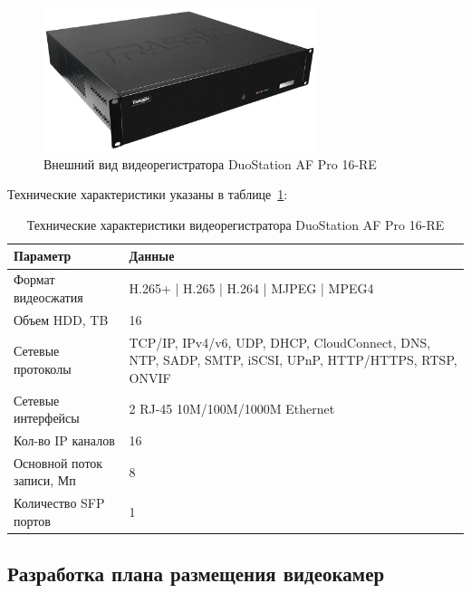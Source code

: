 \begin{figure}[h]
    \begin{center}
        \includegraphics[width=80mm]{images/DuoStation AF Pro 16-RE}
    \end{center}
    \captionsetup{justification=centering}
    \caption{Внешний вид видеорегистратора DuoStation AF Pro 16-RE}
    \label{fig::recorder}
\end{figure}

Технические характеристики указаны в таблице~\ref{tab::recorder-parameters}:
\begin{longtable}{|p{5cm}|p{12cm}|}
    \caption{Технические характеристики видеорегистратора DuoStation AF Pro 16-RE}
    \label{tab::recorder-parameters} \\

    \hline
    Параметр &
    Данные \\
    \hline
    Формат видеосжатия &
    H.265+ | H.265 | H.264 | MJPEG | MPEG4 \\
    \hline
    Объем HDD, TB &
    16 \\
    \hline
    Сетевые протоколы &
    TCP/IP, IPv4/v6, UDP, DHCP, CloudConnect, DNS, NTP, SADP, SMTP, iSCSI, UPnP, HTTP/HTTPS, RTSP, ONVIF \\
    \hline
    Сетевые интерфейсы &
    2 RJ-45 10M/100M/1000M Ethernet \\
    \hline
    Кол-во IP каналов &
    16 \\
    \hline
    Основной поток записи, Мп &
    8 \\
    \hline
    Количество SFP портов &
    1 \\
    \hline
\end{longtable}

\newpage

\subsection{Разработка плана размещения видеокамер}

